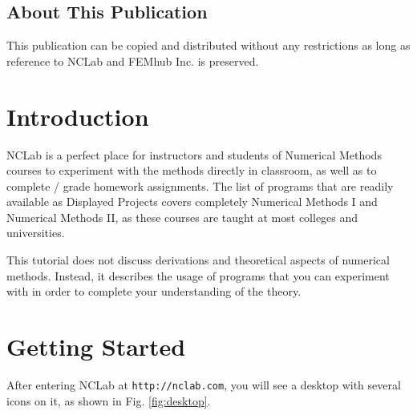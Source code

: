 \documentclass[article,A4,12pt]{llncs}
\begin{document}
\subsection*{About This Publication}
This publication can be copied and distributed without any restrictions
as long as reference to NCLab and FEMhub Inc. is preserved.


\normalsize

\newpage
\setcounter{tocdepth}{2}
\tableofcontents

\newpage

\pagestyle{plain}
\setcounter{page}{1}


\section{Introduction}

NCLab is a perfect place for instructors and students of Numerical Methods 
courses to experiment with the methods directly in classroom, as well as to 
complete / grade homework assignments. The list of programs that are readily 
available as Displayed Projects covers completely Numerical Methods I and 
Numerical Methods II, as these courses are taught at most colleges and 
universities. 

This tutorial does not discuss derivations and theoretical aspects of 
numerical methods. Instead, it describes the usage of programs 
that you can experiment with in order to complete your understanding 
of the theory. 

\section{Getting Started}

After entering NCLab at {\tt http://nclab.com}, you will see a desktop with several icons on it,
as shown in Fig. \ref{fig:desktop}. 
\end{document}
